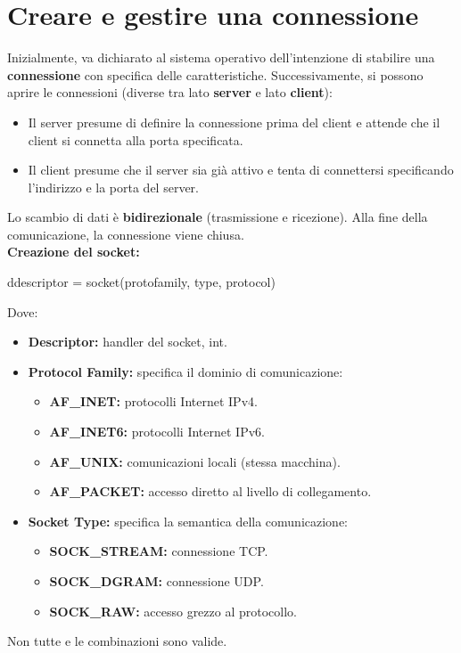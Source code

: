 \section{Creare e gestire una connessione}
Inizialmente, va dichiarato al sistema operativo dell'intenzione di stabilire una \textbf{connessione} con specifica delle caratteristiche. Successivamente, si possono aprire le connessioni (diverse tra lato \textbf{server} e lato \textbf{client}):
\begin{itemize}
    \item Il server presume di definire la connessione prima del client e attende che il client si connetta alla porta specificata.
    \item Il client presume che il server sia già attivo e tenta di connettersi specificando l'indirizzo e la porta del server.
\end{itemize}
Lo scambio di dati è \textbf{bidirezionale} (trasmissione e ricezione). Alla fine della comunicazione, la connessione viene chiusa.\\

\vspace*{0.02\textheight}
\textbf{Creazione del socket:}
\begin{cbox}
ddescriptor = socket(protofamily, type, protocol)
\end{cbox}
Dove:
\begin{itemize}
    \item \textbf{Descriptor:} handler del socket, int.
    \item \textbf{Protocol Family:} specifica il dominio di comunicazione:
    \begin{itemize}
        \item \textbf{AF\_INET:} protocolli Internet IPv4.
        \item \textbf{AF\_INET6:} protocolli Internet IPv6.
        \item \textbf{AF\_UNIX:} comunicazioni locali (stessa macchina).
        \item \textbf{AF\_PACKET:} accesso diretto al livello di collegamento.
    \end{itemize}
    \item \textbf{Socket Type:} specifica la semantica della comunicazione:
    \begin{itemize}
        \item \textbf{SOCK\_STREAM:} connessione TCP.
        \item \textbf{SOCK\_DGRAM:} connessione UDP.
        \item \textbf{SOCK\_RAW:} accesso grezzo al protocollo. 
    \end{itemize}
\end{itemize}
Non tutte e le combinazioni sono valide.

